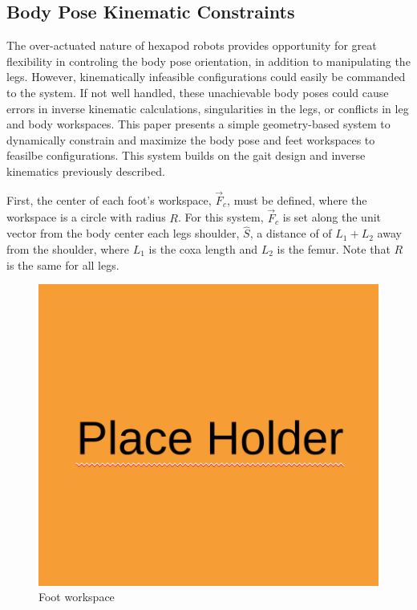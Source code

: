 \subsection{ Body Pose Kinematic Constraints }

The over-actuated nature of hexapod robots provides opportunity for great flexibility in controling the body pose orientation, in addition to manipulating the legs. However, kinematically infeasible configurations could easily be commanded to the system. If not well handled, these unachievable body poses could cause errors in inverse kinematic calculations, singularities in the legs, or conflicts in leg and body workspaces. This paper presents a simple geometry-based system to dynamically constrain and maximize the body pose and feet workspaces to feasilbe configurations. This system builds on the gait design and inverse kinematics previously described. 

First, the center of each foot's workspace, $\vec{F}_c$, must be defined, where the workspace is a circle with radius $R$. For this system, $\vec{F}_c$ is set along the unit vector from the body center each legs shoulder, $\hat{S}$, a distance of of $L_1 + L_2$ away from the shoulder, where $L_1$ is the coxa length and $L_2$ is the femur. Note that $R$ is the same for all legs. 

\begin{figure}[H]
    \centerline{\includegraphics[scale=0.3]{place_holder.png}}
    \caption{Foot workspace}
    \label{fig:foot_workspace}
\end{figure}


